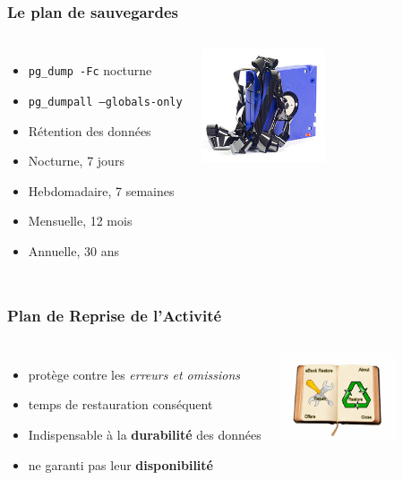 \documentclass[english]{beamer}
\begin{document}
\begin{frame}[fragile]
  \frametitle{Le plan de sauvegardes}


\begin{columns}[c]

  \begin{itemize}
   \item<1-> \texttt{pg\_dump -Fc} nocturne
   \item<1-> \texttt{pg\_dumpall --globals-only}
   \item<2-> Rétention des données
   \item<2-> Nocturne, 7 jours
   \item<2-> Hebdomadaire, 7 semaines
   \item<2-> Mensuelle, 12 mois
   \item<3-> Annuelle, 30 ans
  \end{itemize}  

\includegraphics[height=9em]{online-backup.jpg}
\end{columns}
\end{frame}

\begin{frame}[fragile]
  \frametitle{Plan de Reprise de l'Activité}

  \linebreak
  \linebreak

\begin{columns}[c]

  \begin{itemize}
    \item<1-> protège contre les \textit{erreurs et omissions}
    \item<1-> temps de restauration conséquent
    \item<2-> Indispensable à la \textbf{durabilité} des données
    \item<2-> ne garanti pas leur \textbf{disponibilité}
  \end{itemize}

\includegraphics[height=7em]{restore.png}
\end{columns}
\end{frame}
\end{document}
